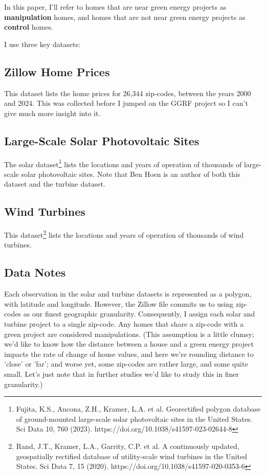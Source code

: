 \documentclass{article}
\begin{document}
In this paper, I'll  refer to homes that are near green energy projects as \textbf{manipulation} homes, and homes that are not near green energy projects as \textbf{control} homes.

I use three key datasets:

\subsection{Zillow Home Prices}
This dataset lists the home prices for 26,344 zip-codes, between the years 2000 and 2024.
This was collected before I jumped on the GGRF project so I can't give much more insight into it.

\subsection{Large-Scale Solar Photovoltaic Sites}
The solar dataset\footnote{Fujita, K.S., Ancona, Z.H., Kramer, L.A. et al. Georectified polygon database of ground-mounted large-scale solar photovoltaic sites in the United States. Sci Data 10, 760 (2023). https://doi.org/10.1038/s41597-023-02644-8} lists the locations and years of operation of thousands of large-scale solar photovoltaic sites.
Note that Ben Hoen is an author of both this dataset and the turbine dataset.

\subsection{Wind Turbines}
This dataset\footnote{
Rand, J.T., Kramer, L.A., Garrity, C.P. et al. A continuously updated, geospatially rectified database of utility-scale wind turbines in the United States. Sci Data 7, 15 (2020). https://doi.org/10.1038/s41597-020-0353-6} lists the locations and years of operation of thousands of wind turbines.

\subsection{Data Notes}
Each observation in the solar and turbine datasets is represented as a polygon, with latitude and longitude.
However, the Zillow file commits us to using zip-codes as our finest geographic granularity.
Consequently, I assign each solar and turbine project to a single zip-code. 
Any homes that share a zip-code with a green project are considered manipulations.
(This assumption is a little clumsy; we'd like to know how the distance between a house and a green energy project impacts the rate of change of house values, and here we're rounding distance to 'close' or 'far'; and worse yet, some zip-codes are rather large, and some quite small. Let's just note that in further studies we'd like to study this in finer granularity.)
\end{document}
